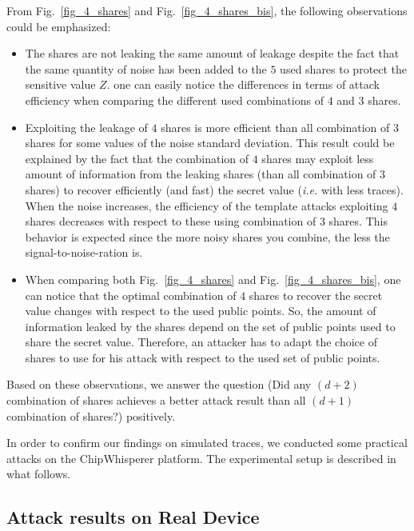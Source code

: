 \documentclass{llncs}
\begin{document}
From Fig.~\ref{fig_4_shares} and Fig.~\ref{fig_4_shares_bis}, the following observations could be emphasized:

\begin{itemize}
\item The shares are not leaking the same amount of leakage despite the fact that the same quantity of noise has been added to the $5$ used shares to protect the sensitive value $Z$. one can easily notice the differences in terms of attack efficiency when comparing the different used combinations of $4$ and $3$ shares.
\item Exploiting the leakage of $4$ shares is more efficient than all combination of $3$ shares for some values of the noise standard deviation. This result could be explained by the fact that the combination of $4$ shares may exploit less amount of information from the leaking shares (than all combination of $3$ shares) to recover efficiently (and fast) the secret value (\emph{i.e.} with less traces). When the noise increases, the efficiency of the template attacks exploiting $4$ shares decreases with respect to these using combination of $3$ shares. This behavior is expected since the more noisy shares you combine, the less the signal-to-noise-ration is. 
\item When comparing both Fig.~\ref{fig_4_shares} and Fig.~\ref{fig_4_shares_bis}, one can notice that the optimal combination of $4$ shares to recover the secret value changes with respect to the used public points. So, the amount of information leaked by the shares depend on the set of public points used to share the secret value. Therefore, an attacker has to adapt the choice of shares to use for his attack with respect to the used set of public points.
\end{itemize}

Based on these observations, we answer the question (Did any $(d+2)$ combination of shares achieves a better attack result than all $(d+1)$ combination of shares?) positively. 

In order to confirm our findings on simulated traces, we conducted some practical attacks on the ChipWhisperer platform. The experimental setup is described in what follows. 

\subsection{Attack results on Real Device}
\end{document}
